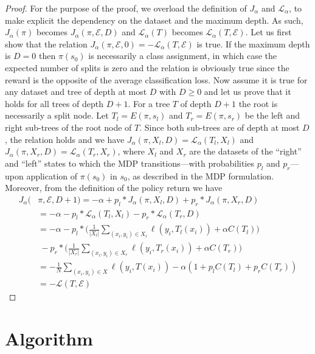\begin{proof}
For the purpose of the proof, we overload the definition of $J_\alpha$ and $\mathcal L_\alpha$, to make explicit the dependency on the dataset and the maximum depth. 
As such, $J_\alpha(\pi)$ becomes $J_\alpha(\pi, {\mathcal E}, D)$ and ${\mathcal L}_\alpha(T)$ becomes ${\mathcal L}_\alpha(T, {\mathcal E})$. 
Let us first show that the relation $J_\alpha(\pi, {\mathcal E}, 0) = -{\mathcal L}_\alpha(T, {\mathcal E})$ is true. 
If the maximum depth is $D = 0$ then $\pi(s_0)$ is necessarily a class assignment, in which case the expected number of splits is zero and the relation is obviously true since the reward is the opposite of the average classification loss. 
Now assume it is true for any dataset and tree of depth at most $D$ with $D \geq 0$ and let us prove that it holds for all trees of depth $D + 1$. 
For a tree $T$ of depth $D + 1$ the root is necessarily a split node. Let $T_l = E(\pi, s_l)$ and $T_r = E(\pi, s_r)$ be the left and right sub-trees of the root node of $T$. 
Since both sub-trees are of depth at most $D$, the relation holds and we have $J_\alpha(\pi, X_l, D) = {\mathcal L}_\alpha(T_l, X_l)$ and $J_\alpha(\pi, X_r, D) = {\mathcal L}_\alpha(T_r, X_r)$, where $X_l$ and $X_r$ are the datasets of the ``right'' and ``left'' states to which the MDP transitions---with probabilities $p_l$ and $p_r$---upon application of $\pi(s_0)$ in $s_0$, as described in the MDP formulation. 
Moreover, from the definition of the policy return we have 
\begin{align*}
   J_\alpha(&\pi, {\mathcal E}, D + 1) = -\alpha + p_l * J_\alpha(\pi, X_l, D) + p_r * J_\alpha(\pi, X_r, D)\\
   &= -\alpha - p_l * {\mathcal L}_\alpha(T_l, X_l) - p_r * {\mathcal L}_\alpha(T_r, D)\\
   &= -\alpha - p_l * \Bigg(\frac{1}{|X_l|}\sum_{(x_i, y_i)\in X_l}\ell(y_i, T_l(x_i))  + \alpha C(T_l)\Bigg)\\
   &\ - p_r * \Bigg(\frac{1}{|X_r|}\sum_{(x_i, y_i)\in X_r}\ell(y_i, T_r(x_i))  + \alpha C(T_r)\Bigg)\\
   &= -\frac{1}{N}\sum_{(x_i, y_i)\in X}\ell(y_i, T(x_i)) - \alpha (1 + p_l C(T_l) + p_r C(T_r))\\
   &= -{\mathcal L}(T, {\mathcal E}) 
\end{align*}
\end{proof}

\section{Algorithm}\label{sec:dpdt}

